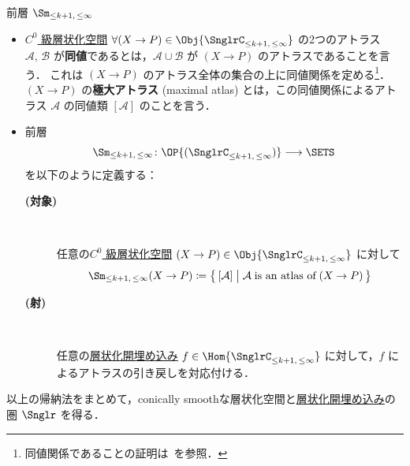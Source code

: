 \documentclass[TQFT_main]{subfiles}
\begin{document}
\begin{mydef}[label=def:Sm-induction,breakable]{前層 $\Sm_{\le k+1,\, \le \infty}$}
\begin{itemize}
        \item \hyperref[def:Snglr-C0]{$C^0$ 級層状化空間} $\forall (X \to P) \in \Obj{\SnglrC_{\le k+1,\, \le \infty}}$ の2つのアトラス $\mathcal{A},\, \mathcal{B}$ が\textbf{同値}であるとは，$\mathcal{A} \cup \mathcal{B}$ が $(X \to P)$ のアトラスであることを言う．
        これは $(X \to P)$ のアトラス全体の集合の上に同値関係を定める\footnote{同値関係であることの証明は~\cite[Lemma 3.2.11.]{AFT2014stratified}を参照．}．
        $(X \to P)$ の\textbf{極大アトラス} (maximal atlas) とは，この同値関係によるアトラス $\mathcal{A}$ の同値類 $[\mathcal{A}]$ のことを言う．

        \item 前層
        \begin{align}
            \Sm_{\le k+1,\, \le \infty} \colon \OP{(\SnglrC_{\le k+1,\, \le \infty})} \lto \SETS
        \end{align}
        を以下のように定義する：
        \begin{description}
            \item[\textbf{(対象)}]　
            
            任意の\hyperref[def:Snglr-C0]{$C^0$ 級層状化空間} $(X \to P) \in \Obj{\SnglrC_{\le k+1,\, \le \infty}}$ に対して
            \begin{align}
                \Sm_{\le k+1,\, \le \infty} (X \to P) \coloneqq \bigl\{\, [\mathcal{A}] \bigm| \mathcal{A}\; \text{is an atlas of}\; (X \to P) \,\bigr\} 
            \end{align}
            
            \item[\textbf{(射)}]　
            
            任意の\hyperref[def:strat-emb]{層状化開埋め込み} $f \in \Hom{\SnglrC_{\le k+1,\, \le \infty}}$ に対して，$f$ によるアトラスの引き戻しを対応付ける．
        \end{description}
    \end{itemize}
\end{mydef}

以上の帰納法をまとめて，conically smoothな層状化空間と\hyperref[def:strat-emb]{層状化開埋め込み}の圏 $\Snglr$ を得る．
\end{document}
